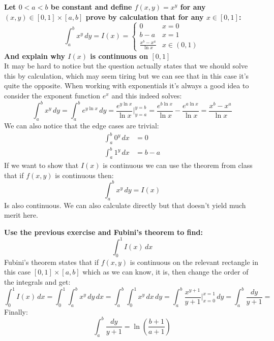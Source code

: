 \documentclass{article}
\theoremstyle{plain}
\begin{document}
	\textbf{Let $0 < a < b$ be constant and define $f(x,y) = x^y$ for any
	$(x,y)\in[0,1]\times[a,b]$ prove by calculation that for any $x\in[0,1]$:
	\[
		\int_{a}^{b}{x^y\,dy} = I(x) = \begin{cases}
			0 &x=0 \\
			b-a &x=1 \\
			\frac{x^b - x^a}{\ln x} &x\in(0,1)
		\end{cases}
	\]
	And explain why $I(x)$ is continuous on $[0,1]$} \\
	It may be hard to notice but the question actually states that we should
	solve this by calculation, which may seem tiring but we can see that
	in this case it's quite the opposite. When working with exponentials
	it's always a good idea to consider the exponent function $e^x$ and
	this indeed solves:
	\[
		\int_{a}^{b}{x^y\,dy} = 
		\int_{a}^{b}{e^{y\ln x}\,dy} = 
		\frac{e^{y\ln x}}{\ln x} \biggr\vert^{y=b}_{y=a} = 
		\frac{e^{b\ln x}}{\ln x} - 
		\frac{e^{a\ln x}}{\ln x} =
		\frac{x^b - x^a}{\ln x}
	\]
	We can also notice that the edge cases are trivial:
	\begin{align*}
		\int_{a}^{b}{0^y\,dx} &= 0 \\
		\int_{a}^{b}{1^y\,dx} &= b-a
	\end{align*}
	If we want to show that $I(x)$ is continuous we can use the theorem
	from class that if $f(x,y)$ is continuous then:
	\[
		\int_{a}^{b}{x^y\,dy} = I(x)
	\]
	Is also continuous. We can also calculate directly but that doesn't
	yield much merit here.
	
	\newpage
	
	\textbf{Use the previous exercise and Fubini's theorem to find:
	\[
		\int_{0}^{1}{I(x)\,dx}
	\]}
	Fubini's theorem states that if $f(x,y)$ is continuous on the relevant
	rectangle in this case $[0,1]\times[a,b]$ which as we can know, it is,
	then change the order of the integrals and get:
	\[
		\int_{0}^{1}{I(x)\,dx} = 
		\int_{0}^{1}{\int_{a}^{b}{x^y\,dy}\,dx} = 
		\int_{a}^{b}{\int_{0}^{1}{x^y\,dx}\,dy} =
		\int_{a}^{b}{\frac{x^{y+1}}{y+1}\biggr\vert_{x=0}^{x=1}\,dy} = 
		\int_{a}^{b}{\frac{dy}{y+1}} = 
	\]
	Finally:
	\[
		\int_{a}^{b}{\frac{dy}{y+1}} = \ln\left(\frac{b+1}{a+1}\right)
	\]
	
	\newpage
	
\end{document}
